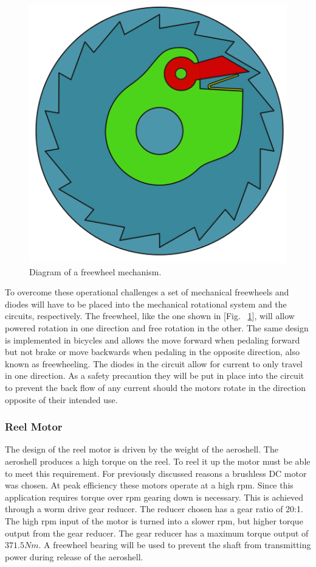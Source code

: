 \begin{figure}[H]
  \centering
  \includegraphics[width=.5\textwidth]{Figures/Freewheel.png}
  \caption{\label{fig:Freewheel}Diagram of a freewheel mechanism.}
\end{figure}

\indent\indent To overcome these operational challenges a set of mechanical freewheels and diodes will have to be placed into the mechanical rotational system and the circuits, respectively. The freewheel, like the one shown in [Fig. ~\ref{fig:Freewheel}], will allow powered rotation in one direction and free rotation in the other. The same design is implemented in bicycles and allows the move forward when pedaling forward but not brake or move backwards when pedaling in the opposite direction, also known as freewheeling. The diodes in the circuit allow for current to only travel in one direction. As a safety precaution they will be put in place into the circuit to prevent the back flow of any current should the motors rotate in the direction opposite of their intended use.

\subsubsection{Reel Motor}

\indent\indent The design of the reel motor is driven by the weight of the aeroshell. The aeroshell produces a high torque on the reel. To reel it up the motor must be able to meet this requirement. For previously discussed reasons a brushless DC motor was chosen. At peak efficiency these motors operate at a high rpm. Since this application requires torque over rpm gearing down is necessary. This is achieved through a worm drive gear reducer. The reducer chosen has a gear ratio of 20:1. The high rpm input of the motor is turned into a slower rpm, but higher torque output from the gear reducer. The gear reducer has a maximum torque output of $371.5 Nm$. A freewheel bearing will be used to prevent the shaft from transmitting power during release of the aeroshell.

